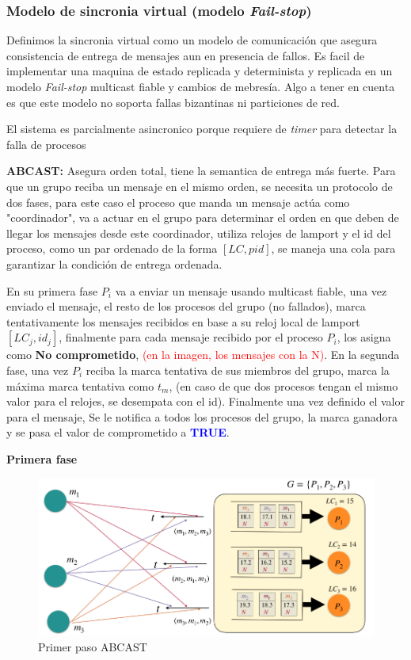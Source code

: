 \subsubsection{Modelo de sincronia virtual (modelo \textit{Fail-stop})}
Definimos la sincronia virtual como un modelo de comunicación que asegura consistencia de entrega de mensajes aun en presencia de fallos. Es facil de implementar una maquina de estado replicada y determinista y replicada  en un modelo \textit{Fail-stop} multicast fiable y cambios de mebresía. Algo a tener en cuenta es que este modelo no soporta fallas bizantinas ni particiones de red.

El sistema es parcialmente asincronico porque requiere de \textit{timer} para detectar la falla de procesos 

\textbf{ABCAST:} Asegura orden total, tiene la semantica de entrega más fuerte. Para que un grupo reciba un mensaje en el mismo orden, se necesita un protocolo de dos fases, para este caso el proceso que manda un mensaje actúa como "coordinador", va a actuar en el grupo para determinar el orden en que deben de llegar los mensajes desde este coordinador, utiliza relojes de lamport y el id del proceso, como un par ordenado de la forma $\left[LC, \textit{pid}\right]$, se maneja una cola para garantizar la condición de entrega ordenada.

En su primera fase $P_i$ va a enviar un mensaje usando multicast fiable, una vez enviado el mensaje, el resto de los procesos del grupo (no fallados), marca tentativamente los mensajes recibidos en base a su reloj local de lamport $\left[LC_j, id_j\right]$, finalmente para cada mensaje recibido por el proceso $P_i$, los asigna como \textbf{No comprometido}, \textcolor{red}{(en la imagen, los mensajes con la N)}. En la segunda fase, una vez $P_i$ reciba la marca tentativa de sus miembros del grupo, marca la máxima marca tentativa como $t_m$, (en caso de que dos procesos tengan el mismo valor para el relojes, se desempata con el id). Finalmente una vez definido el valor para el mensaje, Se le notifica a todos los procesos del grupo, la marca ganadora y se pasa el valor de comprometido a \textcolor{blue}{\textbf{TRUE}}.

\textbf{Primera fase}
\begin{figure}[H]
    \centering
    \includegraphics[width=0.7\linewidth]{img/Primer_paso.png}
    \caption{Primer paso ABCAST}\label{fig:1761653095435}
\end{figure}

